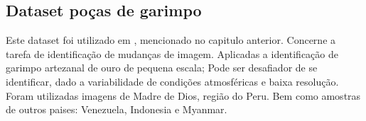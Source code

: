 

\subsection{Dataset poças de garimpo}\label{sec:Cap2_amazonia_garimpo}

Este dataset foi utilizado em \cite{rs14071746}, mencionado no capitulo anterior. Concerne a tarefa de identificação de mudanças de imagem. Aplicadas a identificação de garimpo artezanal de ouro de pequena escala; Pode ser desafiador de se identificar, dado a variabilidade de condições atmosféricas e baixa resolução. Foram utilizadas imagens de Madre de Dios, região do Peru. Bem como amostras de outros paises: Venezuela, Indonesia e Myanmar.



